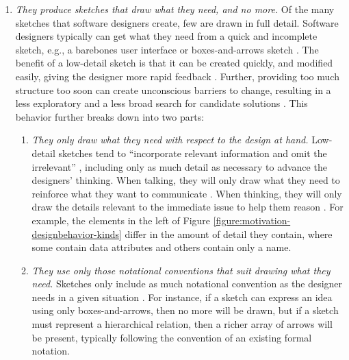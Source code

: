 \begin{enumerate}
\item \emph{They produce sketches that draw what they need, and no more.} Of the many sketches that software designers create, few are drawn in full detail. Software designers typically can get what they need from a quick and incomplete sketch, e.g., a barebones user interface or boxes-and-arrows sketch \cite{virzi1996usability}. The benefit of a low-detail sketch is that it can be created quickly, and modified easily, giving the designer more rapid feedback \cite{cherubini2007let,petre2009insights}. Further, providing too much structure too soon can create unconscious barriers to change, resulting in a less exploratory and a less broad search for candidate solutions \citep{wong1992rough}. This behavior further breaks down into two parts:
 \begin{enumerate}
 \item \emph{They only draw what they need with respect to the design at hand.} Low-detail sketches tend to “incorporate relevant information and omit the irrelevant” \cite{tversky2002sketches}, including only as much detail as necessary to advance the designers' thinking. When talking, they will only draw what they need to reinforce what they want to communicate \cite{petre2009insights}. When thinking, they will only draw the details relevant to the immediate issue to help them reason \citep{dekel2007notation}. For example, the elements in the left of Figure \ref{figure:motivation-designbehavior-kinds} differ in the amount of detail they contain, where some contain data attributes and others contain only a name.
 \item \emph{They use only those notational conventions that suit drawing what they need.} Sketches only include as much notational convention as the designer needs in a given situation \cite{petre2009insights}. For instance, if a sketch can express an idea using only boxes-and-arrows, then no more will be drawn, but if a sketch must represent a hierarchical relation, then a richer array of arrows will be present, typically following the convention of an existing formal notation.
 \end{enumerate}


\end{enumerate}

